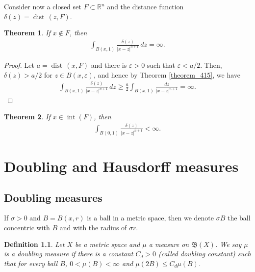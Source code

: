 \documentclass[11pt]{book}
\newtheorem{definition}{Definition}[chapter]
\newtheorem{theorem}{Theorem}[chapter]
\theoremstyle{definition}
\numberwithin{equation}{chapter}
\def\dist{{\operatorname{dist}\,}}
\begin{document}
\medskip

Consider now a closed set $F \subset \mathbb{R}^n$ and the distance function $\delta(z) = \dist (z,F)$.

\medskip

\begin{theorem}
If $x \notin F$, then
\begin{align*}
    \int_{B(x,1)} \frac{\delta(z)}{\left|x-z\right|^{n+1}} \,dz = \infty.
\end{align*}
\end{theorem}
\begin{proof}
Let $a = \dist (x,F)$ and there is $\varepsilon > 0$ such that $\varepsilon < a/2$. Then, $\delta(z) > a/2$ for $z \in B(x,\varepsilon)$, and hence by Theorem \ref{theorem_415}, we have
\begin{align*}
    \int_{B(x,1)} \frac{\delta(z)}{\left|x-z\right|^{n+1}} \,dz \geq \frac{a}{2} \int_{B(x,1)} \frac{dz}{\left|x-z\right|^{n+1}} = \infty.
\end{align*}
\end{proof}

\medskip

\begin{theorem}
If $x \in \operatorname{int}(F)$, then
\begin{align*}
    \int_{B(0,1)} \frac{\delta(z)}{\left|x-z\right|^{n+1}} < \infty.
\end{align*}
\end{theorem}










\chapter{Doubling and Hausdorff measures}

\section{Doubling measures}

If $\sigma > 0$ and $B = B(x,r)$ is a ball in a metric space,  then we denote $\sigma B$ the ball concentric with $B$ and with the radius of $\sigma r$.

\medskip

\begin{definition}
Let $X$ be a metric space and $\mu$ a measure on $\mathfrak{B}(X)$. We say $\mu$ is a doubling measure if there is a constant $C_d > 0$ (called doubling constant) such that for every ball $B$, $0 < \mu(B) < \infty$ and $\mu(2B) \leq C_d \mu(B)$.
\end{definition}
\end{document}
